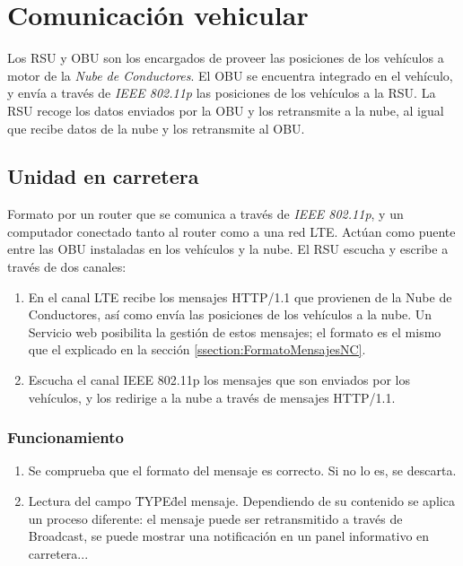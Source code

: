 \section{Comunicación vehicular}\label{section:comunicacion_vehicular}
Los RSU y OBU son los encargados de proveer las posiciones de los vehículos a motor de la \emph{Nube de Conductores}. El OBU se encuentra integrado en el vehículo, y envía a través de \emph{IEEE 802.11p} las posiciones de los vehículos a la RSU. La RSU recoge los datos enviados por la OBU y los retransmite a la nube, al igual que recibe datos de la nube y los retransmite al OBU.

\subsection{Unidad en carretera}\label{subsection:unidad_carretera}
Formato por un router que se comunica a través de \emph{IEEE 802.11p}, y un computador conectado tanto al router como a una red LTE. Actúan como puente entre las OBU instaladas en los vehículos y la nube. El RSU escucha y escribe a través de dos canales:
\begin{enumerate}
	\item En el canal LTE recibe los mensajes HTTP/1.1 que provienen de la Nube de Conductores, así como envía las posiciones de los vehículos a la nube. Un Servicio web posibilita la gestión de estos mensajes; el formato es el mismo que el explicado en la sección \ref{ssection:FormatoMensajesNC}.
		
	\item Escucha el canal IEEE 802.11p los mensajes que son enviados por los vehículos, y los redirige a la nube a través de mensajes HTTP/1.1.
\end{enumerate}

\subsubsection{Funcionamiento}
\begin{enumerate}
	\item Se comprueba que el formato del mensaje es correcto. Si no lo es, se descarta.
	\item Lectura del campo \"TYPE\" del mensaje. Dependiendo de su contenido se aplica un proceso diferente: el mensaje puede ser retransmitido a través de Broadcast, se puede mostrar una notificación en un panel informativo en carretera...
\end{enumerate}
		
